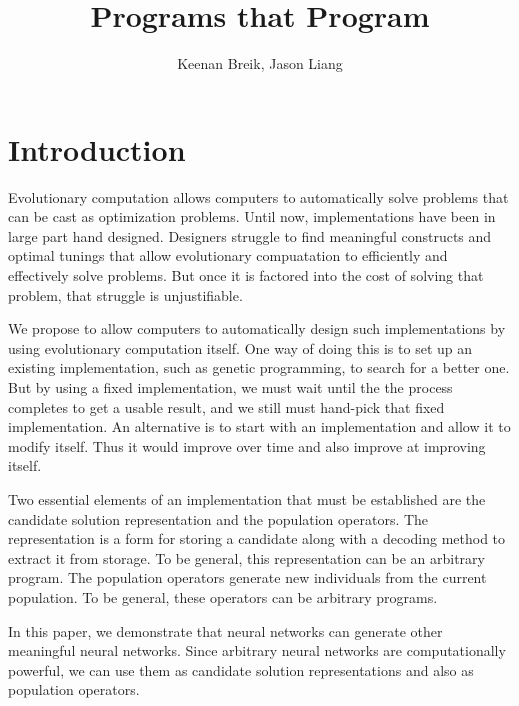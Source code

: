 \documentclass[12pt]{article}
\begin{document}
\title{Programs that Program}

\author{Keenan Breik, Jason Liang}
\date{}
\maketitle

\begin{abstract}
\end{abstract}

\section{Introduction}
\label{intro}

Evolutionary computation allows computers
to automatically solve problems
that can be cast as optimization problems.
Until now, implementations have been
in large part hand designed.
Designers struggle to find meaningful constructs
and optimal tunings that allow evolutionary compuatation
to efficiently and effectively solve problems.
But once it is factored into the cost
of solving that problem,
that struggle is unjustifiable.

We propose to allow computers
to automatically design such implementations
by using evolutionary computation itself.
One way of doing this is to set up
an existing implementation,
such as genetic programming,
to search for a better one.
But by using a fixed implementation,
we must wait until the the process completes
to get a usable result,
and we still must hand-pick that fixed implementation.
An alternative is to start with an implementation
and allow it to modify itself.
Thus it would improve over time
and also improve at improving itself.

Two essential elements of an implementation
that must be established
are the candidate solution representation
and the population operators.
The representation is a form for storing a candidate
along with a decoding method
to extract it from storage.
To be general,
this representation can be an arbitrary program.
The population operators
generate new individuals from the current population.
To be general,
these operators can be arbitrary programs.

In this paper,
we demonstrate that neural networks
can generate other meaningful neural networks.
Since arbitrary neural networks are computationally powerful,%
\cite{sperduti1997netpower}
we can use them as candidate solution representations
and also as population operators.
\end{document}
